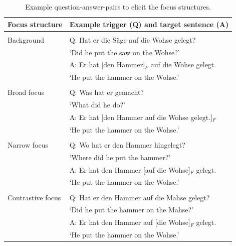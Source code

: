 \begin{table}[htp]
\begin{center}
\caption{Example question-answer-pairs to elicit the focus structures.}
\label{tab:focus_trigger_target}
\begin{tabular}{l l}
Focus structure & Example trigger (Q) and target sentence (A) \\
\hline
& \\
Background & Q: Hat er die Säge auf die Wohse gelegt? \\
& \hspace{5 mm}`Did he put the saw on the Wohse?' \\
& A: Er hat [den Hammer]$_F$ auf die Wohse gelegt. \\
& \hspace{5 mm}`He put the hammer on the Wohse.'\\
& \\
Broad focus & Q: Was hat er gemacht? \\
& \hspace{5 mm}`What did he do?' \\
& A: Er hat [den Hammer auf die Wohse gelegt.]$_F$ \\
& \hspace{5 mm}`He put the hammer on the Wohse.' \\
& \\
Narrow focus & Q: Wo hat er den Hammer hingelegt? \\
& \hspace{5 mm}`Where did he put the hammer?' \\
& A: Er hat den Hammer [auf die Wohse]$_F$ gelegt. \\
& \hspace{5 mm}`He put the hammer on the Wohse.' \\
& \\
Contrastive focus & Q: Hat er den Hammer auf die Mahse gelegt? \\
& \hspace{5 mm}`Did he put the hammer on the Mahse?' \\
& A: Er hat den Hammer auf [die Wohse]$_F$ gelegt. \\
& \hspace{5 mm}`He put the hammer on the Wohse.'
\end{tabular}
\end{center}
\end{table}

